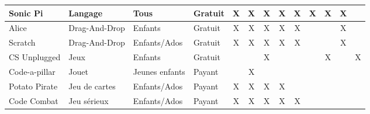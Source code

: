 \begin{table}[htb]
\begin{changemargin}{-3cm}{-3cm}
{\begin{tabular}{|l|l|l|l|c|c|c|c|c|c|c|c|c|}
Sonic Pi          & Langage        & Tous           & Gratuit & X                             & X                               & X                              & X                           & X                             & X                                & X                                 & X                                    &                              \\ \hline
Alice             & Drag-And-Drop  & Enfants        & Gratuit & X                             & X                               & X                              & X                           & X                             &                                  &                                   & X                                    &                              \\ \hline
Scratch           & Drag-And-Drop  & Enfants/Ados   & Gratuit & X                             & X                               & X                              & X                           & X                             &                                  &                                   & X                                    &                              \\ \hline
CS Unplugged      & Jeux           & Enfants        & Gratuit &                               &                                 & X                              &                             &                               &                                  & X                                 &                                      & X                            \\ \hline
Code-a-pillar     & Jouet          & Jeunes enfants & Payant  &                               & X                               &                                &                             &                               &                                  &                                   &                                      &                              \\ \hline
Potato Pirate     & Jeu de cartes  & Enfants/Ados   & Payant  & X                             & X                               & X                              & X                           &                               &                                  &                                   &                                      &                              \\ \hline
Code Combat       & Jeu sérieux    & Enfants/Ados   & Payant  & X                             & X                               & X                              & X                           & X                             &                                  &                                   &                                      &                              \\ \hline

\end{tabular}}
\end{changemargin}
\end{table}
